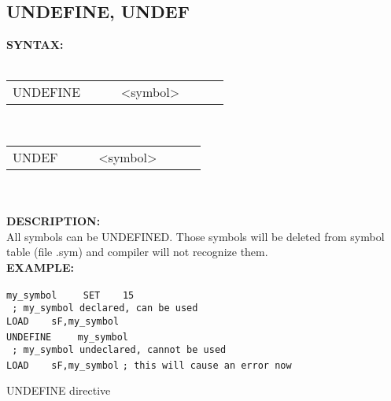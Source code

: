                 \subsection{UNDEFINE, UNDEF}
                \textbf{SYNTAX:}\\
                \\ {
                        \texttt{}
                            \begin{tabular}[h!]{llll}
                                { \color{highlight_directive} UNDEFINE }\verb`     `
                                { \color{highlight_symbol} <symbol> }
                            \end{tabular}
                    }\\{
                        \texttt{}
                            \begin{tabular}[h!]{llll}
                                { \color{highlight_directive} UNDEF }\verb`     `
                                { \color{highlight_symbol} <symbol> }
                            \end{tabular}
                    \\
                    \\
                \textbf{DESCRIPTION:}\\
                All symbols can be UNDEFINED. Those symbols will be deleted from symbol table (file .sym) and compiler will not recognize them.\\
                \textbf{EXAMPLE:}\\
                        \begin{code}[h!]
                            {\color{highlight_symbol}\verb'my_symbol'}\verb'    '
                            {\color{highlight_directive}\verb'SET'}\verb'    '{\color{highlight_constant}\verb'15'}\\
                            {\color{highlight_comment}\verb` ; my_symbol declared, can be used`}\\
                            {\color{highlight_instruction}\verb'LOAD'}\verb'    '{\color{highlight_symbol}\verb'sF,my_symbol'}\\
                            {\color{highlight_directive}\verb'UNDEFINE'}\verb'    '
                            {\color{highlight_symbol}\verb'my_symbol'}\\
                            {\color{highlight_comment}\verb' ; my_symbol undeclared, cannot be used'}\\
                            {\color{highlight_instruction}\verb'LOAD'}\verb'    '{\color{highlight_symbol}\verb'sF,my_symbol'}
                            {\color{highlight_comment}\verb'; this will cause an error now'}
                            \caption{UNDEFINE directive}
                        \end{code}

}
